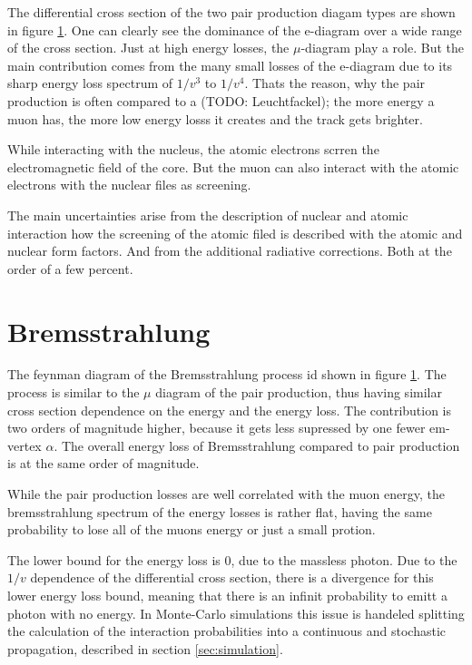The differential cross section of the two pair production diagam types are shown in figure \ref{}.
One can clearly see the dominance of the e-diagram over a wide range of the cross section.
Just at high energy losses, the $\mu$-diagram play a role.
But the main contribution comes from the many small losses of the e-diagram due to its sharp energy loss spectrum of $1/v^3$ to $1/v^4$.
Thats the reason, why the pair production is often compared to a (TODO: Leuchtfackel); the more energy a muon has, the more low energy losss it creates and the track gets brighter.

While interacting with the nucleus, the atomic electrons scrren the electromagnetic field of the core.
But the muon can also interact with the atomic electrons with the nuclear files as screening.

The main uncertainties arise from the description of nuclear and atomic interaction how the screening of the atomic filed is described with the atomic and nuclear form factors.
And from the additional radiative corrections.
Both at the order of a few percent.

\section{Bremsstrahlung}

The feynman diagram of the Bremsstrahlung process id shown in figure \ref{}.
The process is similar to the $\mu$ diagram of the pair production, thus having similar cross section dependence on the energy and the energy loss.
The contribution is two orders of magnitude higher, because it gets less supressed by one fewer em-vertex $\alpha$.
The overall energy loss of Bremsstrahlung compared to pair production is at the same order of magnitude.

While the pair production losses are well correlated with the muon energy, the bremsstrahlung spectrum of the energy losses is rather flat, having the same probability to lose all of the muons energy or just a small protion.

The lower bound for the energy loss is 0, due to the massless photon.
Due to the $1/v$ dependence of the differential cross section, there is a divergence for this lower energy loss bound, meaning that there is an infinit probability to emitt a photon with no energy.
In Monte-Carlo simulations this issue is handeled splitting the calculation of the interaction probabilities into a continuous and stochastic propagation, described in section \ref{sec:simulation}.

